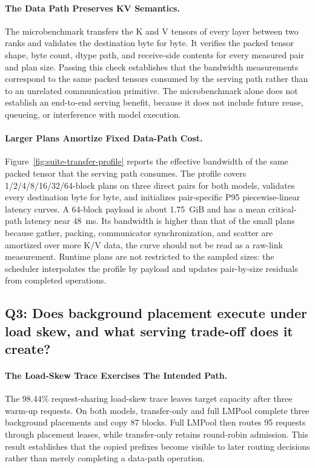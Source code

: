 \documentclass{article}
\newcommand{\sys}{LMPool}
\begin{document}
\paragraph{The Data Path Preserves KV Semantics.} The microbenchmark transfers the K and V tensors of every layer between two ranks and validates the destination byte for byte. It verifies the packed tensor shape, byte count, dtype path, and receive-side contents for every measured pair and plan size. Passing this check establishes that the bandwidth measurements correspond to the same packed tensors consumed by the serving path rather than to an unrelated communication primitive. The microbenchmark alone does not establish an end-to-end serving benefit, because it does not include future reuse, queueing, or interference with model execution.

\paragraph{Larger Plans Amortize Fixed Data-Path Cost.} Figure~\ref{fig:suite-transfer-profile} reports the effective bandwidth of the same packed tensor that the serving path consumes. The profile covers 1/2/4/8/16/32/64-block plans on three direct pairs for both models, validates every destination byte for byte, and initializes pair-specific P95 piecewise-linear latency curves. A 64-block payload is about 1.75~GiB and has a mean critical-path latency near 48~ms. Its bandwidth is higher than that of the small plans because gather, packing, communicator synchronization, and scatter are amortized over more K/V data, the curve should not be read as a raw-link measurement. Runtime plans are not restricted to the sampled sizes: the scheduler interpolates the profile by payload and updates pair-by-size residuals from completed operations.

\subsection{Q3: Does background placement execute under load skew, and what serving trade-off does it create?}

\paragraph{The Load-Skew Trace Exercises The Intended Path.} The 98.44\% request-sharing load-skew trace leaves target capacity after three warm-up requests. On both models, transfer-only and full \sys{} complete three background placements and copy 87 blocks. Full \sys{} then routes 95 requests through placement leases, while transfer-only retains round-robin admission. This result establishes that the copied prefixes become visible to later routing decisions rather than merely completing a data-path operation.
\end{document}
